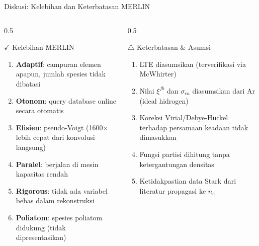 \documentclass[aspectratio=169, 10pt]{beamer}
\begin{document}
\begin{frame}{Diskusi: Kelebihan dan Keterbatasan MERLIN}
  \begin{columns}[T]
    \begin{column}{0.5\textwidth}
      \begin{exampleblock}{\textcolor{green!50!black}{$\checkmark$} Kelebihan MERLIN}
        \begin{enumerate}\small
          \item \textbf{Adaptif}: campuran elemen apapun, jumlah spesies tidak dibatasi
          \item \textbf{Otonom}: query database online secara otomatis
          \item \textbf{Efisien}: pseudo-Voigt (1600$\times$ lebih cepat dari konvolusi langsung)
          \item \textbf{Paralel}: berjalan di mesin kapasitas rendah
          \item \textbf{Rigorous}: tidak ada variabel bebas dalam rekonstruksi
          \item \textbf{Poliatom}: spesies poliatom didukung (tidak dipresentasikan)
        \end{enumerate}
      \end{exampleblock}
    \end{column}
    \begin{column}{0.5\textwidth}
      \begin{alertblock}{\textcolor{red!70!black}{$\triangle$} Keterbatasan \& Asumsi}
        \begin{enumerate}\small
          \item LTE diasumsikan (terverifikasi via McWhirter)
          \item Nilai $\xi^{fb}$ dan $\sigma_{ea}$ diasumsikan dari Ar (ideal hidrogen)
          \item Koreksi Virial/Debye-Hückel terhadap persamaan keadaan tidak dimasukkan
          \item Fungsi partisi dihitung tanpa ketergantungan densitas
          \item Ketidakpastian data Stark dari literatur propagasi ke $n_e$
        \end{enumerate}
      \end{alertblock}
    \end{column}
  \end{columns}
\end{frame}
\end{document}
